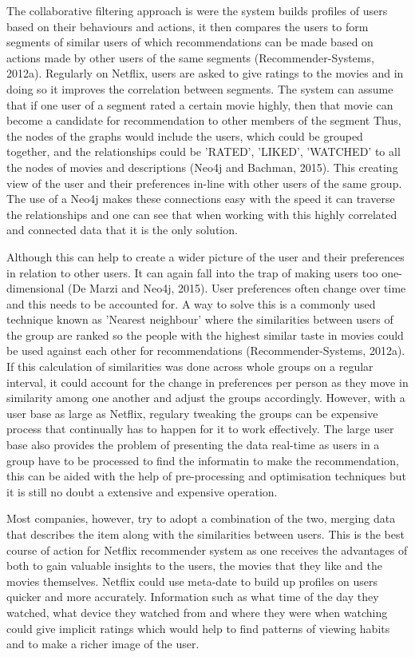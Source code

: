 \documentclass[a4paper]{article}
\begin{document}
The collaborative filtering approach is were the system builds profiles of users based on their behaviours and actions, it then compares the users to form segments of similar users of which recommendations can be made based on actions made by other users of the same segments (Recommender-Systems, 2012a). Regularly on Netflix, users are asked to give ratings to the movies and in doing so it improves the correlation between segments. The system can assume that if one user of a segment rated a certain movie highly, then that movie can become a candidate for recommendation to other members of the segment Thus, the nodes of the graphs would include the users, which could be grouped together, and the relationships could be 'RATED', 'LIKED', 'WATCHED' to all the nodes of movies and descriptions (Neo4j and Bachman, 2015). This creating view of the user and their preferences in-line with other users of the same group. The use of a Neo4j makes these connections easy with the speed it can traverse the relationships and one can see that when working with this highly correlated and connected data that it is the only solution. \par

Although this can help to create a wider picture of the user and their preferences in relation to other users. It can again fall into the trap of making users too one-dimensional (De Marzi and Neo4j, 2015). User preferences often change over time and this needs to be accounted for. A way to solve this is a commonly used technique known as 'Nearest neighbour' where the similarities between users of the group are ranked so the people with the highest similar taste in movies could be used against each other for recommendations (Recommender-Systems, 2012a). If this calculation of similarities was done across whole groups on a regular interval, it could account for the change in preferences per person as they move in similarity among one another and adjust the groups accordingly. However, with a user base as large as Netflix, regulary tweaking the groups can be expensive process that continually has to happen for it to work effectively. The large user base also provides the problem of presenting the data real-time as users in a group have to be processed to find the informatin to make the recommendation, this can be aided with the help of pre-processing and optimisation techniques but it is still no doubt a extensive and expensive operation.

Most companies, however, try to adopt a combination of the two, merging data that describes the item along with the similarities between users. This is the best course of action for Netflix recommender system as one receives the advantages of both to gain valuable insights to the users, the movies that they like and the movies themselves. Netflix could use meta-date to build up profiles on users quicker and more accurately. Information such as what time of the day they watched, what device they watched from and where they were when watching could give implicit ratings which would help to find patterns of viewing habits and to make a richer image of the user. \par
\end{document}
